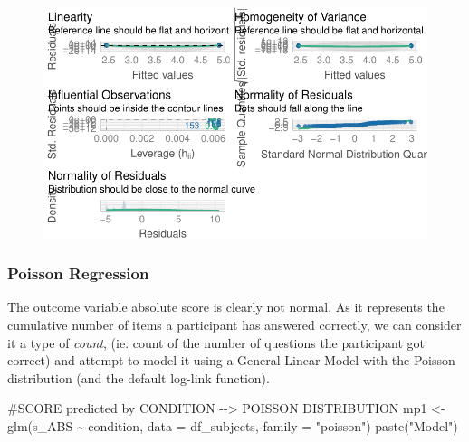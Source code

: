\documentclass[
  letterpaper,
  DIV=11,
  numbers=noendperiod]{scrreprt}
\newenvironment{Shaded}{\begin{snugshade}}{\end{snugshade}}
\newcommand{\AttributeTok}[1]{\textcolor[rgb]{0.40,0.45,0.13}{#1}}
\newcommand{\CommentTok}[1]{\textcolor[rgb]{0.37,0.37,0.37}{#1}}
\newcommand{\FunctionTok}[1]{\textcolor[rgb]{0.28,0.35,0.67}{#1}}
\newcommand{\NormalTok}[1]{\textcolor[rgb]{0.00,0.23,0.31}{#1}}
\newcommand{\OtherTok}[1]{\textcolor[rgb]{0.00,0.23,0.31}{#1}}
\newcommand{\SpecialCharTok}[1]{\textcolor[rgb]{0.37,0.37,0.37}{#1}}
\newcommand{\StringTok}[1]{\textcolor[rgb]{0.13,0.47,0.30}{#1}}
\begin{document}
\begin{figure}[H]

{\centering \includegraphics{analysis/SGC3A/4_sgc3A_hypotesting_files/figure-pdf/MODEL-SUB_ABS-combined-1.pdf}

}

\end{figure}

\hypertarget{poisson-regression}{%
\subsubsection{Poisson Regression}\label{poisson-regression}}

The outcome variable absolute score is clearly not normal. As it
represents the cumulative number of items a participant has answered
correctly, we can consider it a type of \emph{count}, (ie. count of the
number of questions the participant got correct) and attempt to model it
using a General Linear Model with the Poisson distribution (and the
default log-link function).

\begin{Shaded}
\end{Shaded}

\begin{Shaded}
\begin{Highlighting}[]
\CommentTok{\#SCORE predicted by CONDITION {-}{-}\textgreater{} POISSON DISTRIBUTION}
\NormalTok{mp1 }\OtherTok{\textless{}{-}} \FunctionTok{glm}\NormalTok{(s\_ABS }\SpecialCharTok{\textasciitilde{}}\NormalTok{ condition, }\AttributeTok{data =}\NormalTok{ df\_subjects, }\AttributeTok{family =} \StringTok{"poisson"}\NormalTok{)}
\FunctionTok{paste}\NormalTok{(}\StringTok{"Model"}\NormalTok{)}
\end{Highlighting}
\end{Shaded}
\end{document}
